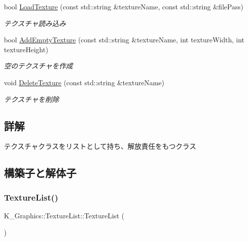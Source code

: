 \begin{DoxyCompactItemize}
bool \mbox{\hyperlink{class_k___graphics_1_1_texture_list_ab743facbd1bda2b2bc665171bdb34b48}{Load\+Texture}} (const std\+::string \&texture\+Name, const std\+::string \&file\+Pass)
\begin{DoxyCompactList}\small\item\em テクスチャ読み込み \end{DoxyCompactList}\item 
bool \mbox{\hyperlink{class_k___graphics_1_1_texture_list_afab7447d6ed329a257436a20aad2cae3}{Add\+Empty\+Texture}} (const std\+::string \&texture\+Name, int texture\+Width, int texture\+Height)
\begin{DoxyCompactList}\small\item\em 空のテクスチャを作成 \end{DoxyCompactList}\item 
void \mbox{\hyperlink{class_k___graphics_1_1_texture_list_af5823a146cd8494b261ddcdf0d515859}{Delete\+Texture}} (const std\+::string \&texture\+Name)
\begin{DoxyCompactList}\small\item\em テクスチャを削除 \end{DoxyCompactList}\end{DoxyCompactItemize}


\subsection{詳解}
テクスチャクラスをリストとして持ち、解放責任をもつクラス 

\subsection{構築子と解体子}
\mbox{\label{class_k___graphics_1_1_texture_list_a32733fdf9b63714a2730fccfe6d4d39b}} 
\subsubsection{\texorpdfstring{Texture\+List()}{TextureList()}}
{\footnotesize\ttfamily K\+\_\+\+Graphics\+::\+Texture\+List\+::\+Texture\+List (\begin{DoxyParamCaption}{ }\end{DoxyParamCaption})}



